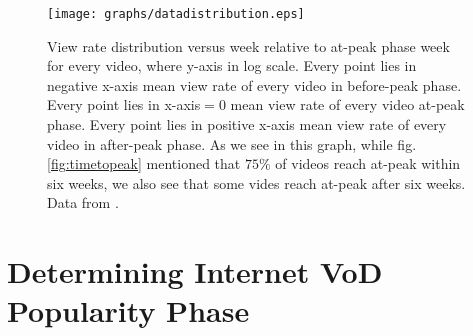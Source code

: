 \documentclass[10pt,final,journal,a4paper]{IEEEtran}
\begin{document}
\begin{figure}[!t]
\begin{center}
\texttt{[image: graphs/datadistribution.eps]}
\end{center}
\caption{View rate distribution versus week relative to at-peak phase week for every video, where y-axis in log scale.
Every point lies in negative x-axis mean view rate of every video in before-peak phase.
Every point lies in x-axis$=0$ mean view rate of every video at-peak phase. 
Every point lies in positive x-axis mean view rate of every video in after-peak phase.
As we see in this graph, while fig.\ref{fig:timetopeak} mentioned that $75\%$ of videos reach at-peak within six weeks, we also see that some vides reach at-peak after six weeks.
Data from \cite{Borghol:2011:CMP:2039452.2039717}. }
\label{fig:viewratedistribution}
\end{figure} 



\section{Determining Internet VoD Popularity Phase}\label{popularity}
\end{document}
